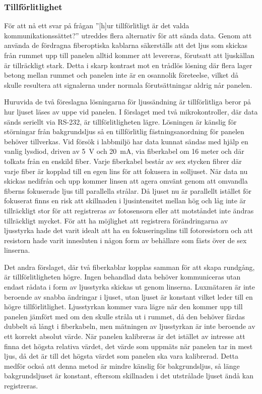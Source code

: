 
        \subsubsection{Tillförlitlighet} %
        \label{sub:tillf_rlitlighet}
            För att nå ett svar på frågan ''[h]ur tillförlitligt är det valda kommunikationssättet?'' utreddes flera alternativ för att sända data. Genom att använda de fördragna fiberoptiska kablarna säkerställs att det ljus som skickas från rummet upp till panelen alltid kommer att levereras, förutsatt att ljuskällan är tillräckligt stark. Detta i skarp kontrast mot en trådlös lösning där flera lager betong mellan rummet och panelen inte är en osannolik företeelse, vilket då skulle resultera att signalerna under normala förutsättningar aldrig når panelen. \bigskip

            Huruvida de två föreslagna lösningarna för ljussändning är tillförlitliga beror på hur ljuset läses av uppe vid panelen. I förslaget med två mikrokontroller, där data sänds seriellt via RS-232, är tillförlitligheten lägre. Lösningen är känslig för störningar från bakgrundsljus så en tillförlitlig fästningsanordning för panelen behöver tillverkas. Vid försök i labbmiljö har data kunnat sändas med hjälp en vanlig lysdiod, driven av 5~V och 20~mA, via fiberkabel om 16 meter och där tolkats från en enskild fiber. Varje fiberkabel består av sex stycken fibrer där varje fiber är kopplad till en egen lins för att fokusera in solljuset. När data nu skickas nedifrån och upp kommer linsen att agera omvänt genom att omvandla fiberns fokuserade ljus till parallella strålar. Då ljuset nu är parallellt istället för fokuserat finns en risk att skillnaden i ljusintensitet mellan hög och låg inte är tillräckligt stor för att registreras av fotosensorn eller att motståndet inte ändras tillräckligt mycket. För att ha möjlighet att registrera förändringarna av ljusstyrka hade det varit idealt att ha en fokuseringslins till fotoresistorn och att resistorn hade varit innesluten i någon form av behållare som fästs över de sex linserna. \bigskip

            Det andra förslaget, där två fiberkablar kopplas samman för att skapa rundgång, är tillförlitligheten högre. Ingen behandlad data behöver kommuniceras utan endast rådata i form av ljusstyrka skickas ut genom linserna. Luxmätaren är inte beroende av snabba ändringar i ljuset, utan ljuset är konstant vilket leder till en högre tillförlitlighet. Ljusstyrkan kommer vara lägre när den kommer upp till panelen jämfört med om den skulle stråla ut i rummet, då den behöver färdas dubbelt så långt i fiberkabeln, men mätningen av ljusstyrkan är inte beroende av ett korrekt absolut värde. När panelen kalibreras är det istället av intresse att finna det högsta relativa värdet, det värde som uppmäts när panelen tar in mest ljus, då det är till det högsta värdet som panelen ska vara kalibrerad. Detta medför också att denna metod är mindre känslig för bakgrundsljus, så länge bakgrundsljuset är konstant, eftersom skillnaden i det utstrålade ljuset ändå kan registreras.\bigskip 

